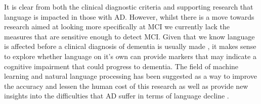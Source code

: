\documentclass[10pt, letterpaper, twoside, openany]{book}
\begin{document}
\par
It is clear from both the clinical diagnostic criteria and supporting research that language is impacted in those with AD. However, whilst there is a move towards research aimed at looking more specifically at MCI we currently lack the measures that are sensitive enough to detect MCI. Given that we know language is affected before a clinical diagnosis of dementia is usually made \cite{Berisha2015, Snowdon1996, Le2011}, it makes sense to explore whether language on it's own can provide markers that may indicate a cognitive impairment that could progress to dementia. The field of machine learning and natural language processing has been suggested as a way to improve the accuracy and lessen the human cost of this research as well as provide new insights into the difficulties that AD suffer in terms of language decline \cite{Boschi2017}.
\end{document}
